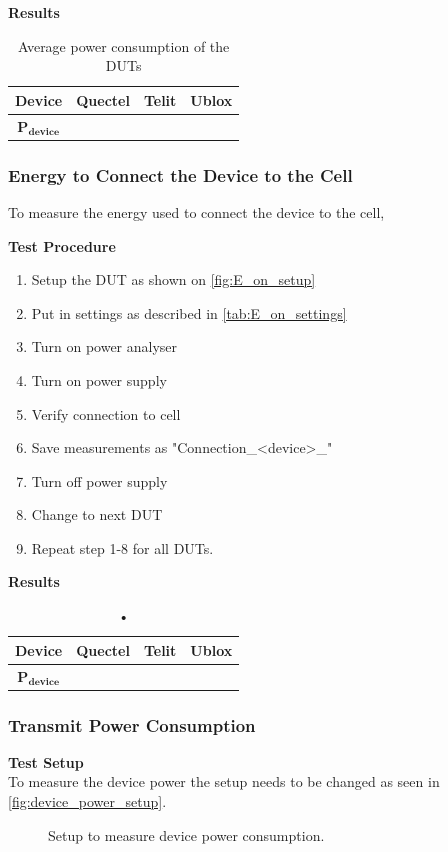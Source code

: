 \textbf{Results}\\
\begin{table}[H]
\centering
\begin{tabular}{|c|c|c|c|}\hline
\textbf{Device}	& Quectel	& Telit & Ublox \\ \hline
$\mathbf{P_{device}}$	& & & \\ \hline
\end{tabular}
\caption{Average power consumption of the \gls{DUT}s}
\label{tab:device_power_results}
\end{table}

\subsubsection{Energy to Connect the Device to the Cell}

To measure the energy used to connect the device to the cell, 


\textbf{Test Procedure}\\
\begin{enumerate}
\item Setup the \gls{DUT} as shown on \autoref{fig:E_on_setup}
\item Put in settings as described in \autoref{tab:E_on_settings} 
\item Turn on power analyser
\item Turn on power supply 
\item Verify connection to cell
\item Save measurements as "Connection\_<device>\_<Parameters used>"
\item Turn off power supply
\item Change to next \gls{DUT}
\item Repeat step 1-8 for all \gls{DUT}s.
\end{enumerate}


\textbf{Results}\\
\begin{table}[H]
\centering
\begin{tabular}{|c|c|c|c|}\hline
\textbf{Device}	& Quectel	& Telit & Ublox \\ \hline
$\mathbf{P_{device}}$	& & & \\ \hline
\end{tabular}
\caption{•}
\label{tab:device_power_results}
\end{table}

\subsubsection{Transmit Power Consumption}
\textbf{Test Setup}\\
To measure the device power the setup needs to be changed as seen in \autoref{fig:device_power_setup}.
\begin{figure}[H]
\centering
{}
\caption{Setup to measure device power consumption.}
\label{fig:device_power_setup}
\end{figure}

